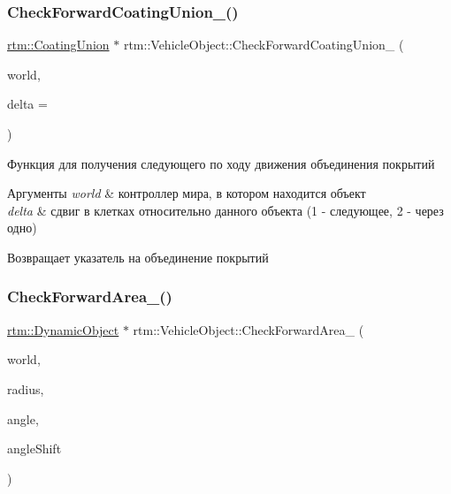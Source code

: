 \subsubsection{\texorpdfstring{Check\+Forward\+Coating\+Union\+\_\+()}{CheckForwardCoatingUnion\_()}}
{\footnotesize\ttfamily \hyperlink{classrtm_1_1_coating_union}{rtm\+::\+Coating\+Union} $\ast$ rtm\+::\+Vehicle\+Object\+::\+Check\+Forward\+Coating\+Union\+\_\+ (\begin{DoxyParamCaption}\item[{\hyperlink{classrtm_1_1_world_controller}{World\+Controller} $\ast$const}]{world,  }\item[{int}]{delta = {} }\end{DoxyParamCaption})\hspace{0.3cm}{\ttfamily [protected]}}

Функция для получения следующего по ходу движения объединения покрытий 
\begin{DoxyParams}{Аргументы}
{\em world} & контроллер мира, в котором находится объект \\
\hline
{\em delta} & сдвиг в клетках относительно данного объекта (1 -\/ следующее, 2 -\/ через одно) \\
\hline
\end{DoxyParams}
\begin{DoxyReturn}{Возвращает}
указатель на объединение покрытий 
\end{DoxyReturn}
\mbox{\label{classrtm_1_1_vehicle_object_a2bc87b24a74b9eefc4e63d6618052c33}} 
\subsubsection{\texorpdfstring{Check\+Forward\+Area\+\_\+()}{CheckForwardArea\_()}}
{\footnotesize\ttfamily \hyperlink{classrtm_1_1_dynamic_object}{rtm\+::\+Dynamic\+Object} $\ast$ rtm\+::\+Vehicle\+Object\+::\+Check\+Forward\+Area\+\_\+ (\begin{DoxyParamCaption}\item[{\hyperlink{classrtm_1_1_world_controller}{World\+Controller} $\ast$const}]{world,  }\item[{float}]{radius,  }\item[{float}]{angle,  }\item[{float}]{angle\+Shift }\end{DoxyParamCaption})\hspace{0.3cm}{\ttfamily [protected]}}

